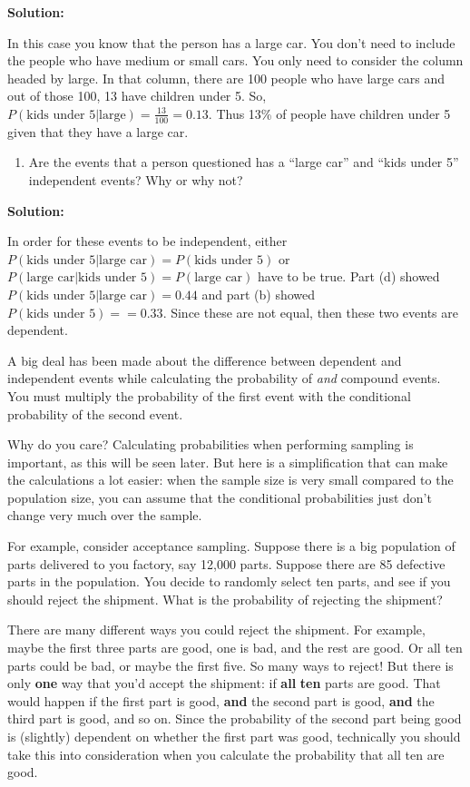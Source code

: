 \documentclass[
]{book}
\providecommand{\tightlist}{%
  \setlength{\itemsep}{0pt}\setlength{\parskip}{0pt}}
\begin{document}
\textbf{Solution:}

In this case you know that the person has a large car. You don't need to include the people who have medium or small cars. You only need to consider the column headed by large. In that column, there
are 100 people who have large cars and out of those 100, 13 have children under 5. So, \(P(\text{kids under 5|large})=\frac{13}{100}=0.13\). Thus 13\% of people have children under 5 given that they have a large car.

\begin{enumerate}
\def\labelenumi{\roman{enumi}.}
\tightlist
\item
  Are the events that a person questioned has a ``large car'' and ``kids under 5'' independent events? Why or why not?
\end{enumerate}

\textbf{Solution:}

In order for these events to be independent, either \(P(\text{kids under 5|large car})=P(\text{kids under 5})\) or \(P(\text{large car|kids under 5})=P(\text{large car})\) have to be true. Part (d) showed \(P(\text{kids under 5|large car})=0.44\) and part (b) showed \(P(\text{kids under 5})==0.33\). Since these are not equal, then these two events are dependent.

A big deal has been made about the difference between dependent and independent events while calculating the probability of \emph{and} compound events. You must multiply the probability of the first event with the
conditional probability of the second event.

Why do you care? Calculating probabilities when performing sampling is important, as this will be seen later. But here is a simplification that can make the calculations a lot easier: when the sample size is very small compared to the population size, you can assume that the conditional probabilities just don't change very much over the sample.

For example, consider acceptance sampling. Suppose there is a big population of parts delivered to you factory, say 12,000 parts. Suppose there are 85 defective parts in the population. You decide to randomly select ten parts, and see if you should reject the shipment. What is the probability of rejecting the shipment?

There are many different ways you could reject the shipment. For example, maybe the first three parts are good, one is bad, and the rest are good. Or all ten parts could be bad, or maybe the first five. So many ways to reject! But there is only \textbf{one} way that you'd accept the shipment: if \textbf{all} \textbf{ten} parts are good. That would happen if the first part is good, \textbf{and} the second part is good, \textbf{and} the third part is good, and so on. Since the probability of the second part being good is (slightly) dependent on whether the first part was good, technically you should take this into consideration when you calculate the probability that all ten are good.
\end{document}
